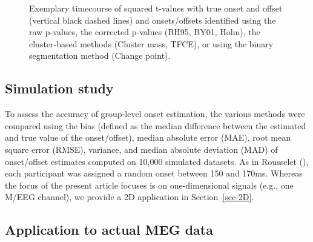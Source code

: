 \documentclass[
  doc,
  floatsintext,
  longtable,
  a4paper,
  nolmodern,
  notxfonts,
  notimes,
  donotrepeattitle,
  colorlinks=true,linkcolor=blue,citecolor=blue,urlcolor=blue]{apa7}
\begin{document}
\begin{figure}[!htb]

\caption{\label{fig-corrections}Exemplary timecourse of squared t-values
with true onset and offset (vertical black dashed lines) and
onsets/offsets identified using the raw p-values, the corrected p-values
(BH95, BY01, Holm), the cluster-based methods (Cluster mass, TFCE), or
using the binary segmentation method (Change point).}


\end{figure}%

\newpage

\subsection{Simulation study}\label{simulation-study}

To assess the accuracy of group-level onset estimation, the various
methods were compared using the bias (defined as the median difference
between the estimated and true value of the onset/offset), median
absolute error (MAE), root mean square error (RMSE), variance, and
median absolute deviation (MAD) of onset/offset estimates computed on
10,000 simulated datasets. As in Rousselet
(), each participant was
assigned a random onset between 150 and 170ms. Whereas the focus of the
present article focuses is on one-dimensional signals (e.g., one M/EEG
channel), we provide a 2D application in Section~\ref{sec-2D}.

\subsection{Application to actual MEG
data}\label{application-to-actual-meg-data}
\end{document}
